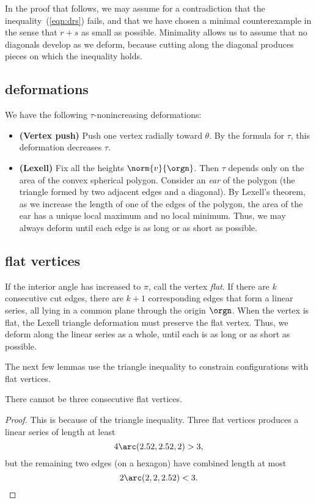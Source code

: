 In the proof that follows, we may assume for a contradiction that the
inequality~(\ref{eqn:drs}) fails, and that we have chosen a minimal counterexample in the sense that $r+s$ as small as possible.   Minimality allows us to assume that no diagonals develop as we deform, because cutting along the diagonal produces pieces on which the inequality holds.

\subsection{deformations}

We have the following $\tau$-nonincreasing deformations:
\begin{itemize}
\item {\bf (Vertex push)} Push one vertex radially toward $\theta$.  By the formula for $\tau$, this deformation decreases $\tau$.
\item {\bf (Lexell)} Fix all the heights $\norm{v}{\orgn}$. Then $\tau$ depends only on the area of the convex spherical polygon.  Consider an {\it ear} of the polygon (the triangle formed by two adjacent edges and a diagonal).  By Lexell's theorem, as we increase the length of one of the edges of the polygon, the area of the ear has a unique local maximum and no local minimum.  Thus, we may always deform until each edge is as long or as short as possible.
\end{itemize}

\subsection{flat vertices}

If the interior angle has increased to $\pi$, call the vertex {\it flat}. 
If there are $k$ consecutive cut edges, there are  $k+1$ corresponding edges that form a linear series, all lying in a common plane through the origin $\orgn$.  When the vertex is flat, the Lexell triangle deformation must preserve the flat vertex.  Thus, we deform along the linear series as a whole, until each is as long or as short as possible.  

The next few lemmas use the triangle inequality to constrain configurations with flat vertices.

\begin{lemma}
There cannot be three consecutive flat vertices.
\end{lemma}

\begin{proof} This is because of the triangle inequality.  Three flat vertices produces a linear series of length at least
$$
4\arc(2.52,2.52,2) > 3,
$$
but the remaining two edges (on a hexagon) have combined length at most
$$
2\arc(2,2,2.52) < 3.
$$
\end{proof}


